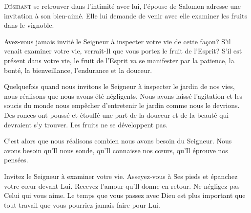 
\lettrine{D}{ésirant} se retrouver dans l'intimité avec lui,
 l'épouse de Salomon adresse une invitation à son bien-aimé.
 Elle lui demande de venir avec elle examiner les fruits dans le vignoble.

Avez-vous jamais invité le Seigneur à inspecter votre vie de cette fa\c{c}on?
 S'il venait examiner votre vie, verrait-Il que vous portez
 le fruit de l'Esprit? S'il est présent dans votre vie,
 le fruit de l'Esprit va se manifester par la patience, la bonté,
 la bienveillance, l'endurance et la douceur.


Quelquefois quand nous invitons le Seigneur à inspecter le jardin de nos vies,
 nous réalisons que nous avons été négligents.
 Nous avons laissé l'agitation et les soucis du monde nous empêcher
 d'entretenir le jardin comme nous le devrions.
 Des ronces ont poussé et étouffé une part de la douceur et de la beauté
 qui devraient s'y trouver. Les fruits ne se développent pas.

C'est alors que nous réalisons combien nous avons besoin du Seigneur.
 Nous avons besoin qu'Il nous sonde, qu'Il connaisse nos c\oe{}urs,
 qu'Il éprouve nos pensées.

Invitez le Seigneur à examiner votre vie. Asseyez-vous à Ses pieds
 et épanchez votre c\oe{}ur devant Lui.
 Recevez l'amour qu'Il donne en retour. Ne négligez pas Celui qui vous aime.
 Le temps que vous passez avec Dieu est plus important
 que tout travail que vous pourriez jamais faire pour Lui.

\dvrule





